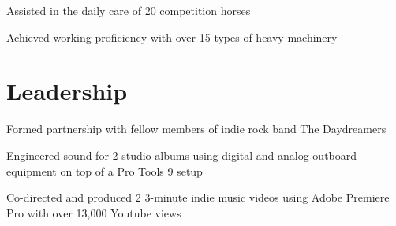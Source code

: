 \documentclass[letterpaper]{deedy-resume} %
\begin{document}
\begin{minipage}[t]{0.66\textwidth}
\sectionspace %








\begin{tightitemize}
\item Assisted in the daily care of 20 competition horses
\item Achieved working proficiency with over 15 types of heavy machinery
\end{tightitemize}

\sectionspace %



\section{Leadership} 


\begin{tightitemize}
\item Formed partnership with fellow members of indie rock band The Daydreamers
\item Engineered sound for 2 studio albums using digital and analog outboard equipment on top of a Pro Tools 9 setup
\item Co-directed and produced 2 3-minute indie music videos using Adobe Premiere Pro with over 13,000 Youtube views
\end{tightitemize}


\end{minipage}
\end{document}
